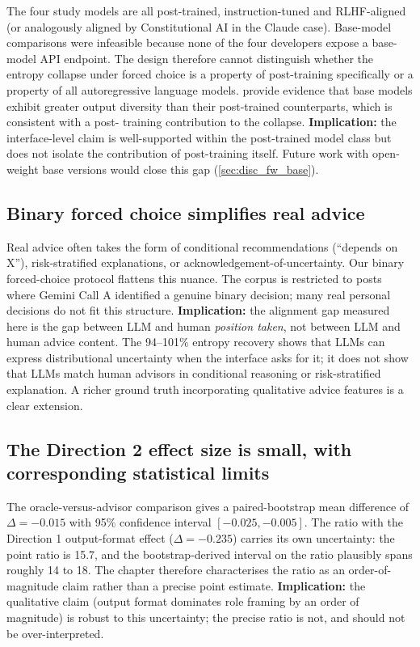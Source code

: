 The four study models are all post-trained, instruction-tuned and
RLHF-aligned (or analogously aligned by Constitutional AI in the
Claude case). Base-model comparisons were infeasible because none of
the four developers expose a base-model API endpoint. The design
therefore cannot distinguish whether the entropy collapse under forced
choice is a property of post-training specifically or a property of
all autoregressive language models. \citet{kirk-2024-rlhf-diversity}
provide evidence that base models exhibit greater output diversity than
their post-trained counterparts, which is consistent with a post-
training contribution to the collapse.
\textbf{Implication:} the interface-level claim is well-supported
within the post-trained model class but does not isolate the
contribution of post-training itself. Future work with open-weight
base versions would close this gap (\cref{sec:disc_fw_base}).

\subsection{Binary forced choice simplifies real advice}
\label{sec:disc_lim_binary}

Real advice often takes the form of conditional recommendations
(``depends on X''), risk-stratified explanations, or
acknowledgement-of-uncertainty. Our binary forced-choice protocol
flattens this nuance. The corpus is restricted to posts where Gemini
Call A identified a genuine binary decision; many real personal
decisions do not fit this structure.
\textbf{Implication:} the alignment gap measured here is the gap
between LLM and human \emph{position taken}, not between LLM and
human advice content. The 94--101\% entropy recovery shows that LLMs
can express distributional uncertainty when the interface asks for
it; it does not show that LLMs match human advisors in conditional
reasoning or risk-stratified explanation. A richer ground truth
incorporating qualitative advice features is a clear extension.

\subsection{The Direction 2 effect size is small, with corresponding statistical limits}
\label{sec:disc_lim_d2_power}

The oracle-versus-advisor comparison gives a paired-bootstrap mean
difference of $\Delta = -0.015$ with 95\% confidence interval
$[-0.025, -0.005]$. The ratio with the Direction 1 output-format
effect ($\Delta = -0.235$) carries its own uncertainty: the point
ratio is 15.7, and the bootstrap-derived interval on the ratio
plausibly spans roughly 14 to 18. The chapter therefore characterises the
ratio as an order-of-magnitude claim rather than a precise point
estimate.
\textbf{Implication:} the qualitative claim (output format dominates
role framing by an order of magnitude) is robust to this uncertainty;
the precise ratio is not, and should not be over-interpreted.

